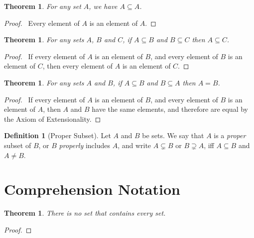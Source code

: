 \documentclass{report}
\let\qed\relax
\newtheorem{thm}[ax]{Theorem}
\theoremstyle{definition}
\newtheorem{df}[ax]{Definition}
\begin{document}
\begin{thm}
\label{thm:subset_ref}
For any set $A$, we have $A \subseteq A$.
\end{thm}

\begin{proof}
\pf\ Every element of $A$ is an element of $A$. \qed
\end{proof}

\begin{thm}
\label{thm:subset_trans}
For any sets $A$, $B$ and $C$, if $A \subseteq B$ and $B \subseteq C$ then $A \subseteq C$.
\end{thm}

\begin{proof}
\pf\ If every element of $A$ is an element of $B$, and every element of $B$ is an element of $C$, then every element of $A$ is an element of $C$. \qed
\end{proof}

\begin{thm}
\label{thm:subset_antisym}
For any sets $A$ and $B$, if $A \subseteq B$ and $B \subseteq A$ then $A = B$.
\end{thm}

\begin{proof}
\pf\ If every element of $A$ is an element of $B$, and every element of $B$ is an element of $A$, then $A$ and $B$ have the same elements, and therefore are equal by the Axiom of Extensionality. \qed
\end{proof}

\begin{df}[Proper Subset]
Let $A$ and $B$ be sets. We say that $A$ is a \emph{proper} subset of $B$, or $B$ \emph{properly} includes $A$, and write $A \subsetneq B$ or $B \supsetneq A$, iff $A \subseteq B$ and $A \neq B$.
\end{df}

\section{Comprehension Notation}

\begin{thm}
There is no set that contains every set.
\end{thm}

\begin{proof}
\pf
{}
\qed
\end{proof}
\end{document}
